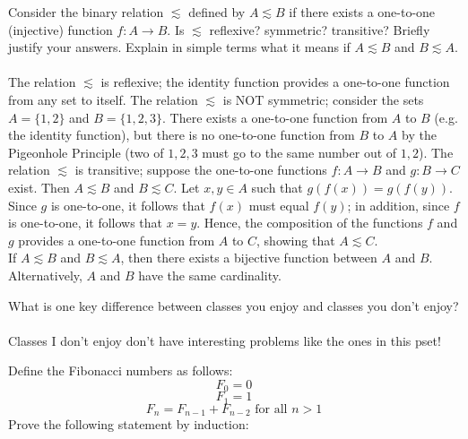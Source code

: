 \documentclass[solution, letterpaper]{cs121}
\begin{document}
Consider the binary relation $\lesssim$ defined by $A \lesssim B$ if there exists a one-to-one (injective) function $f : A \to B$. Is $\lesssim$ reflexive? symmetric? transitive? Briefly justify your answers. Explain in simple terms what it means if $A \lesssim B$ and $B \lesssim A$.
\\\\
The relation $\lesssim$ is reflexive; the identity function provides a one-to-one function from any set to itself.  The relation $\lesssim$ is NOT symmetric; consider the sets $A = \{1, 2\}$ and $B = \{1, 2, 3\}$.  There exists a one-to-one function from $A$ to $B$ (e.g. the identity function), but there is no one-to-one function from $B$ to $A$ by the Pigeonhole Principle (two of $1, 2, 3$ must go to the same number out of $1, 2$).  The relation $\lesssim$ is transitive; suppose the one-to-one functions $f:A \rightarrow B$ and $g:B \rightarrow C$ exist.  Then $A \lesssim B$ and $B \lesssim C$.  Let $x, y \in A$ such that $g(f(x)) = g(f(y))$.  Since $g$ is one-to-one, it follows that $f(x)$ must equal $f(y)$; in addition, since $f$ is one-to-one, it follows that $x = y$.  Hence, the composition of the functions $f$ and $g$ provides a one-to-one function from $A$ to $C$, showing that $A \lesssim C$.
\\\indent If $A \lesssim B$ and $B \lesssim A$, then there exists a bijective function between $A$ and $B$.  Alternatively, $A$ and $B$ have the same cardinality.
 
What is one key difference between classes you enjoy and classes you don't enjoy?
\\\\
Classes I don't enjoy don't have interesting problems like the ones in this pset!

Define the Fibonacci numbers as follows:
\[ F_0 = 0 \]
\[ F_1 = 1 \]
\[F_n = F_{n-1} + F_{n-2} \text{ for all } n > 1\]
Prove the following statement by induction:
\end{document}
